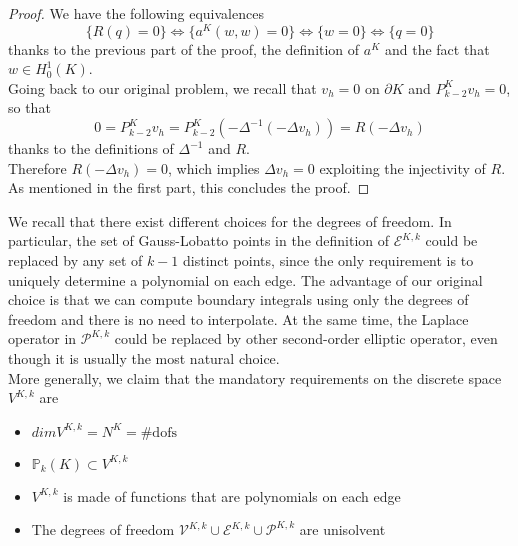 \documentclass[10pt]{article}
\begin{document}
\begin{proof}
	We have the following equivalences 
	$$\lbrace R(q)=0 \rbrace \iff \lbrace a^K(w,w)=0 \rbrace \iff \lbrace w=0 \rbrace \iff \lbrace q=0 \rbrace$$
	thanks to the previous part of the proof, the definition of $a^K$ and the fact that $w \in H_0^1(K)$. \\
	Going back to our original problem, we recall that $v_h=0$ on $\partial K$ and $P^K_{k-2} v_h=0$, so that
	$$0=P^K_{k-2} v_h= P^K_{k-2} (-\Delta^{-1}(-\Delta v_h))=R(-\Delta v_h)$$ thanks to the definitions of $\Delta^{-1}$ and $R$. \\
	Therefore $R(-\Delta v_h)=0$, which implies $\Delta v_h=0$ exploiting the injectivity of $R$. As mentioned in the first part, this concludes the proof.
\end{proof}
We recall that there exist different choices for the degrees of freedom. In particular, the set of Gauss-Lobatto points in the definition of $\mathcal{E}^{K,k}$ could be replaced by any set of $k-1$ distinct points, since the only requirement is to uniquely determine a polynomial on each edge. The advantage of our original choice is that we can compute boundary integrals using only the degrees of freedom and there is no need to interpolate. At the same time, the Laplace operator in $\mathcal{P}^{K,k}$ could be replaced by other second-order elliptic operator, even though it is usually the most natural choice. \\
More generally, we claim that the mandatory requirements on the discrete space $V^{K,k}$ are
\begin{itemize}
	\item $dim V^{K,k}=N^K=\#\text{dofs}$
	\item $\mathbb{P}_k(K) \subset V^{K,k}$
	\item $V^{K,k}$ is made of functions that are polynomials on each edge
	\item The degrees of freedom $\mathcal{V}^{K,k} \cup \mathcal{E}^{K,k} \cup \mathcal{P}^{K,k}$ are unisolvent
\end{itemize}
\end{document}
